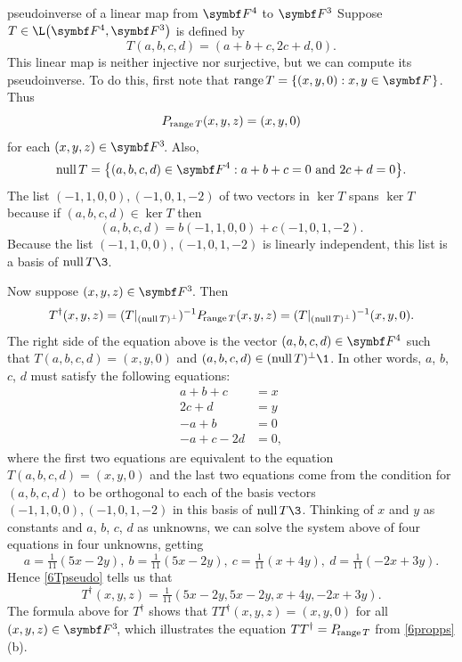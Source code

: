 \begin{example}{pseudoinverse of a linear map from\/ $\F4$ to\/ $\F3$}
Suppose $T \in \L\paren[\big]{ \F4, \F3 }$ is defined by
\[
T(a, b, c, d) = (a + b + c, 2c + d, 0).
\]
This linear map is neither injective nor surjective, but we can compute its pseudo\-inverse. To do this, first note that
$\ran T = \br{(x,y,0) : x, y \in \F{}}$. Thus
\[
P_{\operatorname{range} T}(x,y,z) = (x, y, 0)
\]
for each $(x, y, z) \in \FF3$.
Also,
\[
\ker T = \br[\big]{ (a, b, c, d) \in \F4 : a+b+c= 0 \text{ and } 2c + d = 0}.
\]
The list $(-1, 1, 0, 0), (-1, 0, 1, -2)$ of two vectors in $\ker T$ spans $\ker T$ because if $(a, b, c, d) \in \ker T$ then
\[
(a, b, c, d) = b(-1, 1, 0, 0) + c(-1,0,1,-2).
\]
Because the list $(-1, 1, 0, 0), (-1, 0, 1, -2)$ is linearly independent, this list is a basis of $\ker T\3$.

Now suppose $(x, y, z) \in \FF3$. Then
\begin{equation} \label{6Tpseudo}
T^\dagger(x, y, z) = (T|_{(\operatorname{null} T)^\perp})^{-1} P_{\!\operatorname{range} T} (x, y, z) = (T|_{(\operatorname{null} T)^\perp})^{-1} (x, y, 0).
\end{equation}%
The right side of the equation above is the vector $(a, b, c, d) \in \F4$ such that $T(a, b, c, d) = (x, y, 0)$ and
$(a, b, c, d) \in (\ker T)^\perp\1$. In other words, $a$, $b$, $c$, $d$ must satisfy the following equations:
\begin{align*}
a + b + c &=x \\
2c + d &= y \\
-a + b &= 0 \\
-a + c - 2d &= 0,
\end{align*}
where the first two equations are equivalent to the equation $T(a, b, c, d) = (x, y, 0)$ and the last two equations come from the condition for $(a, b, c, d)$ to be orthogonal to each of the basis vectors $(-1, 1, 0, 0), (-1, 0, 1, -2)$ in this basis of $\ker T\3$. Thinking of $x$ and $y$ as constants and $a$, $b$, $c$, $d$ as unknowns, we can solve the system above of four equations in four unknowns, getting
\[
a = \tfrac{1}{11} (5x-2y),\ b = \tfrac{1}{11} (5x-2y),\ c = \tfrac{1}{11} (x+4y),\ d = \tfrac{1}{11} (-2x + 3y).
\]
Hence \ref{6Tpseudo} tells us that
\[
T^\dagger(x,y,z) = \tfrac{1}{11} (5x-2y, 5x-2y, x+4y, -2x +3y).
\]
The formula above for $T^\dagger$ shows that $TT^\dagger(x, y, z) = (x, y, 0)$ for all $(x, y, z) \in \FF3$, which illustrates the equation $TT^\dagger = P_{\!\operatorname{range} T}$ from \ref{6propps}(b).
\end{example}

